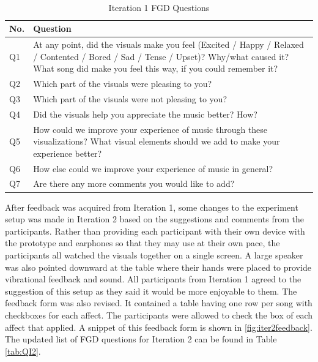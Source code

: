 \begin{table}
  \centering
  \caption{Iteration 1 FGD Questions}~\label{tab:QI1}
  \addtolength{\tabcolsep}{2pt} 
  \begin{tabular}{p{.5cm}|p{7cm}}
  	\toprule
    \rule{0pt}{8pt}No. & Question \\[2pt]
    \toprule
    Q1 & At any point, did the visuals make you feel (Excited / Happy / Relaxed / Contented / Bored / Sad / Tense / Upset)? Why/what caused it? What song did make you feel this way, if you could remember it? \\
    Q2 & Which part of the visuals were pleasing to you? \\
    Q3 & Which part of the visuals were not pleasing to you? \\
    Q4 & Did the visuals help you appreciate the music better? How? \\
	Q5 & How could we improve your experience of music through these visualizations? What visual elements should we add to make your experience better? \\
	Q6 & How else could we improve your experience of music in general? \\
	Q7 & Are there any more comments you would like to add? \\
    \bottomrule
  \end{tabular}
  \addtolength{\tabcolsep}{-2pt} 
\end{table}

After feedback was acquired from Iteration 1, some changes to the experiment setup was made in Iteration 2 based on the suggestions and comments from the participants. Rather than providing each participant with their own device with the prototype and earphones so that they may use at their own pace, the participants all watched the visuals together on a single screen. A large speaker was also pointed downward at the table where their hands were placed to provide vibrational feedback and sound. All participants from Iteration 1 agreed to the suggestion of this setup as they said it would be more enjoyable to them. The feedback form was also revised. It contained a table having one row per song with checkboxes for each affect. The participants were allowed to check the box of each affect that applied. A snippet of this feedback form is shown in \ref{fig:iter2feedback}. The updated list of FGD questions for Iteration 2 can be found in Table \ref{tab:QI2}.

